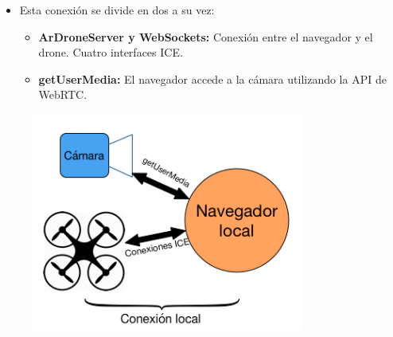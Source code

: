 \documentclass[notes,slidesec,a4]{seminar}
\begin{document}
\begin{hslide}
\begin{minipage}[t]{0.7\textwidth}
\begin{itemize}
\item Esta conexión se divide en dos a su vez:
\begin{itemize}
\item \textbf{ArDroneServer y WebSockets:} Conexión entre el navegador y el drone. Cuatro interfaces ICE.
\item \textbf{getUserMedia:} El navegador accede a la cámara utilizando la API de WebRTC.
\end{itemize}
\end{itemize}

\end{minipage}
\begin{minipage}[t]{0.5\textwidth}
\begin{center}
\begin{figure}
\includegraphics[width=0.8\textwidth]{img/conexionlocal}
\end{figure}
\end{center}
\end{minipage}
\end{hslide}


\end{document}
